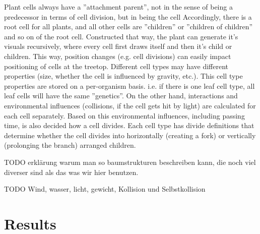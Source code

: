 \documentclass[11pt]{scrartcl}
\begin{document}
Plant cells always have a ''attachment parent'', not in the sense of being a predecessor in terms of cell division, but in being the cell 
Accordingly, there is a root cell for all plants, and all other cells are ''children'' or ''children of children'' and so on of the root cell. Constructed that way, the plant can generate it's visuals recursively, where every cell first draws itself and then it's child or children. This way, position changes (e.g. cell divisions) can easily impact positioning of cells at the treetop.
Different cell types may have different properties (size, whether the cell is influenced by gravity, etc.). This cell type properties are stored on a per-organism basis. i.e. if there is one leaf cell type, all leaf cells will have the same ''genetics''. On the other hand, interactions and environmental influences (collisions, if the cell gets hit by light) are calculated for each cell separately. Based on this environmental influences, including passing time, is also decided how a cell divides. Each cell type has divide definitions that determine whether the cell divides into horizontally (creating a fork) or vertically (prolonging the branch) arranged children.

TODO erklärung warum man so baumstrukturen beschreiben kann, die noch viel diverser sind als das was wir hier benutzen.

TODO Wind, wasser, licht, gewicht, Kollision und Selbstkollision

\section{Results}
\end{document}

